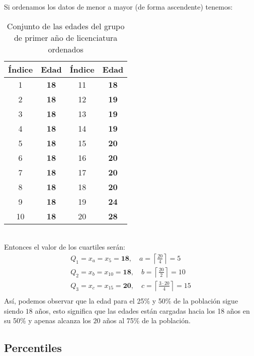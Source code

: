 \documentclass{article}
\begin{document}
Si ordenamos los datos de menor a mayor (de forma ascendente) tenemos:
\begin{table}[h!]
    \centering
    \begin{tabular}{|c|c|c|c|}
    \hline
    \textbf{Índice} & \textbf{Edad} & \textbf{Índice} & \textbf{Edad} \\ \hline
    1 & \textbf{18} & 11 & \textbf{18}  \\ \hline
    2 & \textbf{18} & 12 & \textbf{19}  \\ \hline
    3 & \textbf{18} & 13 & \textbf{19}  \\ \hline
    4 & \textbf{18} & 14 & \textbf{19}  \\ \hline
    5 & \textbf{18} & 15 & \textbf{20}  \\ \hline
    6 & \textbf{18} & 16 & \textbf{20}  \\ \hline
    7 & \textbf{18} & 17 & \textbf{20}  \\ \hline
    8 & \textbf{18} & 18 & \textbf{20}  \\ \hline
    9 & \textbf{18} & 19 & \textbf{24}  \\ \hline
    10 & \textbf{18} & 20 & \textbf{28}  \\ \hline
    \end{tabular}
    \caption{Conjunto de las edades del grupo de primer año de licenciatura ordenados}
\end{table}
\\
Entonces el valor de los cuartiles serán:
\begin{equation}
    \begin{aligned}
        Q_1 = x_{a} = x_{5} = \textbf{18}, \quad a = \left \lceil \frac{20}{4} \right \rceil = 5 \\
        Q_2 = x_{b} = x_{10} = \textbf{18}, \quad b = \left \lceil \frac{20}{2} \right \rceil = 10 \\
        Q_3 = x_{c} = x_{15} = \textbf{20}, \quad c = \left \lceil \frac{3 \cdot 20}{4} \right \rceil = 15 \\
    \end{aligned}
    \label{eq:ejemplo_cuartiles}
\end{equation}
Así, podemos observar que la edad para el 25\% y 50\% de la población sigue siendo $18$ años, esto significa que las edades están cargadas hacia los 18 años en su 50\% y apenas alcanza los $20$ años al 75\% de la población.

\subsection{Percentiles}
\end{document}
